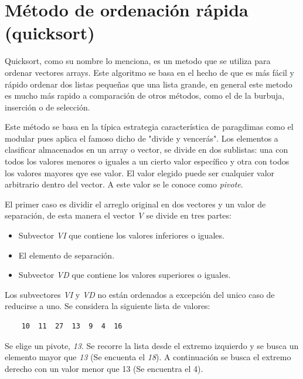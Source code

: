 \documentclass[letterpaper, 12pt]{article}
\begin{document}
  \portada[Tarea 04]
  {\centering\section*{\LARGE Método de ordenación rápida (quicksort)}\vspace{1cm}}
  Quicksort, como su nombre lo menciona, es un metodo que se utiliza para ordenar vectores arrays.
  Este algoritmo se basa en el hecho de que es más fácil y rápido ordenar dos listas pequeñas que 
  una lista grande, en general este metodo es mucho más rapido a comparación de otros métodos, como el
  de la burbuja, inserción o de selección.

  Este método se basa en la típica estrategia característica de paragdimas como el modular pues aplica
  el famoso dicho de "divide y vencerás". Los elementos a clasificar almacenados en un array o vector, se divide
  en dos sublistas: una con todos los valores menores o iguales a un cierto valor específico y otra
  con todos los valores mayores qye ese valor. El valor elegido puede ser cualquier valor arbitrario dentro
  del vector. A este valor se le conoce como \textit{pivote}.

  El primer caso es dividir el arreglo original en dos vectores y un valor de separación, de esta manera el vector
  \textit{V} se divide en tres partes:
  \begin{itemize}
    \item Subvector \textit{VI} que contiene los valores inferiores o iguales.
    \item El elemento de separación.
    \item Subvector \textit{VD} que contiene los valores superiores o iguales.
  \end{itemize}
  
  Los subvectores \textit{VI} y \textit{VD} no están ordenados a excepción del unico caso de reducirse a uno.
  Se considera la siguiente lista de valores:

  \begin{verbatim}
    10  11  27  13  9  4  16
  \end{verbatim}

  Se elige un pivote, \textit{13}. Se recorre la lista desde el extremo izquierdo y se busca un elemento mayor
  que \textit{13} (Se encuenta el \textit{18}). A continuación se busca el extremo derecho con un valor menor que 13
  (Se encuentra el 4).
\end{document}
